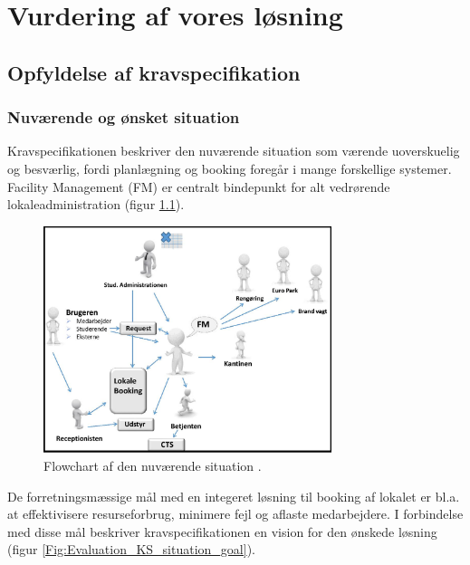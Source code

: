 \chapter{Vurdering af vores løsning}
\label{Evaluation}
\section{Opfyldelse af kravspecifikation}
\label{Evaluation_KS}
\subsection*{Nuværende og ønsket situation}
\label{Evaluation_KS_situation}
Kravspecifikationen beskriver den nuværende situation som værende uoverskuelig og besværlig, fordi planlægning og booking foregår i mange forskellige systemer. Facility Management (FM) er centralt bindepunkt for alt vedrørende lokaleadministration (figur \ref{Fig:Evaluation_KS_situation_current}). 

\begin{figure}[h!]
  \centering
    \includegraphics[width=0.75\textwidth]{Appendix/GUI-Prototype/NuvaerendeFlow}
  \caption{Flowchart af den nuværende situation \cite[s. 4]{kravspec}.}
\label{Fig:Evaluation_KS_situation_current}
\end{figure}

De forretningsmæssige mål med en integeret løsning til booking af lokalet er bl.a. at effektivisere resurseforbrug, minimere fejl og aflaste medarbejdere. I forbindelse med disse mål beskriver kravspecifikationen en vision for den ønskede løsning (figur \ref{Fig:Evaluation_KS_situation_goal}).

